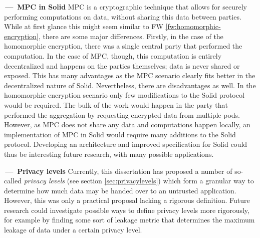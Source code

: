 
\begin{futurework}\label{fw:mpc}
\textbf{\,---\, \gls{MPC} in Solid} \acrlong{MPC} is a cryptographic technique that allows for securely performing computations on data, without sharing this data between parties. While at first glance this might seem similar to FW \ref{fw:homomorphic-encryption}, there are some major differences. Firstly, in the case of the homomorphic encryption, there was a single central party that performed the computation. In the case of \gls{MPC}, though, this computation is entirely decentralized and happens on the parties themselves; data is never shared or exposed. 
This has many advantages as the \gls{MPC} scenario clearly fits better in the decentralized nature of Solid. Nevertheless, there are disadvantages as well. In the homomorphic encryption scenario only few modifications to the Solid protocol would be required. The bulk of the work would happen in the party that performed the aggregation by requesting encrypted data from multiple pods. However, as \gls{MPC} does not share any data and computations happen locally, an implementation of \gls{MPC} in Solid would require many additions to the Solid protocol. Developing an architecture and improved specification for Solid could thus be interesting future research, with many possible applications.
\end{futurework}

\newpage
\begin{futurework}\label{fw:privacy-levels}
\textbf{\,---\, Privacy levels} Currently, this dissertation has proposed a number of so-called \textit{privacy levels} (see section \ref{sec:privacylevels}) which form a granular way to determine how much data may be handed over to an untrusted application. However, this was only a practical proposal lacking a rigorous definition. Future research could investigate possible ways to define privacy levels more rigorously, for example by finding some sort of leakage metric that determines the maximum leakage of data under a certain privacy level.
\end{futurework}

